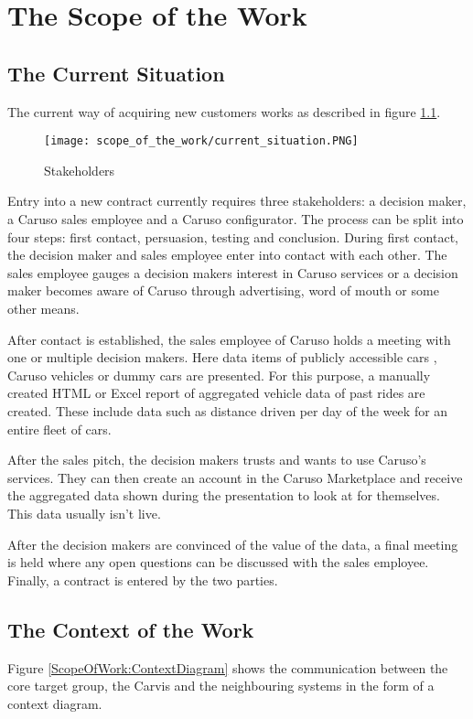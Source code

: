 \chapter{The Scope of the Work}
\section{The Current Situation}
The current way of acquiring new customers works as described in figure \ref{ScopeOfWork:Situation}.
\begin{figure}[ht]
  \centering
  \texttt{[image: scope\_of\_the\_work/current\_situation.PNG]}
  \caption{Stakeholders}
  \label{ScopeOfWork:Situation}
\end{figure}
Entry into a new contract currently requires three stakeholders: a decision maker, a Caruso sales employee and a Caruso configurator. The process can be split into four steps: first contact, persuasion, testing and conclusion. During first contact, the decision maker and sales employee enter into contact with each other. The sales employee gauges a decision makers interest in Caruso services or a decision maker becomes aware of Caruso through advertising, word of mouth or some other means.

After contact is established, the sales employee of Caruso holds a meeting with one or multiple decision makers. Here data items of publicly accessible cars , Caruso vehicles or dummy cars are presented. For this purpose, a manually created HTML or Excel report of aggregated vehicle data of past rides are created. These include data such as distance driven per day of the week for an entire fleet of cars.

After the sales pitch, the decision makers trusts and wants to use Caruso's services. They can then create an account in the Caruso Marketplace and receive the aggregated data shown during the presentation to look at for themselves. This data usually isn't live.

After the decision makers are convinced of the value of the data, a final meeting is held where any open questions can be discussed with the sales employee. Finally, a contract is entered by the two parties.

\section{The Context of the Work}
Figure \ref*{ScopeOfWork:ContextDiagram} shows the communication between the core target group, the Carvis and the neighbouring systems in the form of a context diagram.

